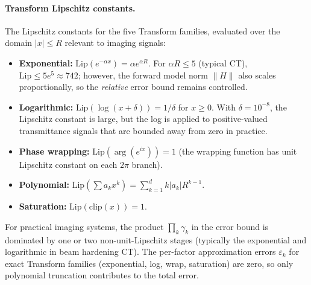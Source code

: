 \paragraph{Transform Lipschitz constants.}
The Lipschitz constants for the five Transform families, evaluated over the domain $|x| \leq R$ relevant to imaging signals:
\begin{itemize}
  \item \textbf{Exponential:} $\mathrm{Lip}(e^{-\alpha x}) = \alpha e^{\alpha R}$. For $\alpha R \leq 5$ (typical CT), $\mathrm{Lip} \leq 5 e^5 \approx 742$; however, the forward model norm $\|H\|$ also scales proportionally, so the \emph{relative} error bound remains controlled.
  \item \textbf{Logarithmic:} $\mathrm{Lip}(\log(x + \delta)) = 1/\delta$ for $x \geq 0$. With $\delta = 10^{-8}$, the Lipschitz constant is large, but the log is applied to positive-valued transmittance signals that are bounded away from zero in practice.
  \item \textbf{Phase wrapping:} $\mathrm{Lip}(\arg(e^{ix})) = 1$ (the wrapping function has unit Lipschitz constant on each $2\pi$ branch).
  \item \textbf{Polynomial:} $\mathrm{Lip}(\sum a_k x^k) = \sum_{k=1}^d k |a_k| R^{k-1}$.
  \item \textbf{Saturation:} $\mathrm{Lip}(\mathrm{clip}(x)) = 1$.
\end{itemize}

For practical imaging systems, the product $\prod_{k} \gamma_k$ in the error bound is dominated by one or two non-unit-Lipschitz stages (typically the exponential and logarithmic in beam hardening CT). The per-factor approximation errors $\varepsilon_k$ for exact Transform families (exponential, log, wrap, saturation) are zero, so only polynomial truncation contributes to the total error.
